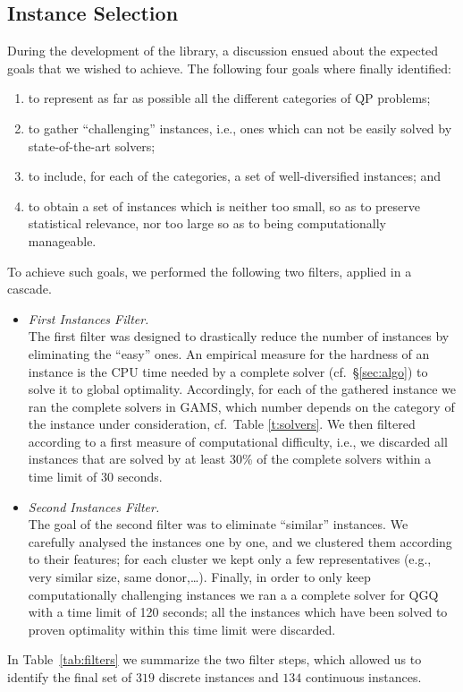\subsection{Instance Selection}\label{subsec:selection}

During the development of the library, a discussion ensued about
the expected goals that we wished to achieve. The following four goals
where finally identified:
%
\begin{enumerate}
 \item to represent as far as possible all the different categories of QP
       problems;
 \item to gather ``challenging'' instances, i.e., ones which can not be easily
       solved by  state-of-the-art solvers;
 \item to include, for each of the categories, a set of well-diversified
       instances; and
 \item to obtain a set of instances which is neither too small, so as to
       preserve statistical relevance, nor too large so as to being
       computationally manageable.
\end{enumerate}
%
To achieve such goals, we performed the following two filters, applied in
a cascade.
%
\begin{itemize}
 \item \emph{First Instances Filter.}\\
       The first filter was designed to drastically reduce the number of
       instances by eliminating the ``easy'' ones. An empirical measure
       for the hardness of an instance is the CPU time needed by a
       complete solver (cf.~\S\ref{sec:algo}) to solve it to
       global optimality. Accordingly, for each of the gathered instance we
       ran the complete solvers in GAMS, which number depends on the category
       of the instance under consideration, cf.~Table \ref{t:solvers}.
       We then filtered according to a first
       measure of computational difficulty, i.e., we discarded all instances
       that are solved by at least 30\% of the complete solvers within a time
       limit of 30 seconds.
 \item \emph{Second Instances Filter.}\\
       The goal of the second filter was to eliminate ``similar'' instances.
       We carefully analysed the instances one by one, and we clustered them
       according to their features; for each cluster we kept only a few
       representatives (e.g., very similar size, same donor,\ldots). Finally, in order to only
       keep computationally challenging instances we ran a a complete solver for QGQ with a time limit of 120 seconds; all the
       instances which have been solved to proven optimality within this time limit
       were discarded.
\end{itemize}
%
In Table~\ref{tab:filters} we summarize the two filter steps, which
allowed us to identify the final set of $319$ discrete instances and
$134$ continuous instances.


